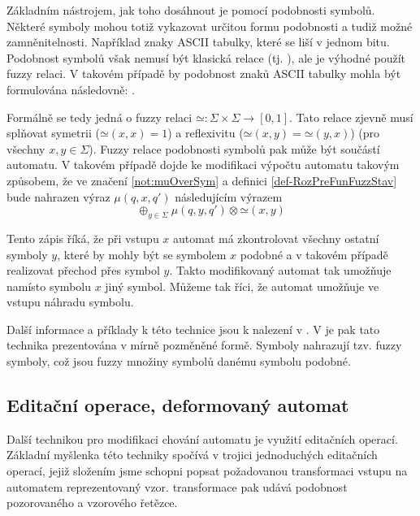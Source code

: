 \documentclass[a4paper,10pt]{article}
\begin{document}
Základním nástrojem, jak toho dosáhnout je pomocí podobnosti symbolů. Některé symboly mohou totiž vykazovat určitou formu podobnosti a tudiž možné zamněnitelnosti. Například znaky ASCII tabulky, které se liší v jednom bitu. Podobnost symbolů však nemusí být klasická  relace (tj. ), ale je výhodné použít fuzzy relaci. V takovém případě by podobnost znaků ASCII tabulky mohla být formulována následovně: .

Formálně se tedy jedná o fuzzy relaci $\mathbin{\simeq}: \Sigma \times \Sigma \rightarrow [0, 1]$. Tato relace zjevně musí splňovat symetrii ($\mathbin{\simeq}(x, x) = 1$) a reflexivitu ($\mathbin{\simeq}(x, y) = \mathbin{\simeq}(y, x)$) (pro všechny $x, y \in \Sigma$).
Fuzzy relace podobnosti symbolů pak může být součástí automatu. V takovém případě dojde ke modifikaci výpočtu automatu takovým způsobem, že ve značení \ref{not:muOverSym} a definici \ref{def-RozPreFunFuzzStav} bude nahrazen výraz $\mu(q, x, q')$ následujícím výrazem
$$
  \oplus_{y \in \Sigma} \mu(q, y, q') \otimes \mathbin{\simeq}(x, y)
$$

Tento zápis říká, že při vstupu $x$ automat má zkontrolovat všechny ostatní symboly $y$, které by mohly být se symbolem $x$ podobné a v takovém případě realizovat přechod přes symbol $y$. Takto modifikovaný automat tak umožňuje namísto symbolu $x$  jiný symbol. Můžeme tak říci, že automat umožňuje ve vstupu náhradu symbolu.

Další informace a příklady k této technice jsou k nalezení v \cite{RamGir-ConvFinAutFuzzAutStrComp}. V \cite{Ech-DefSyssConPre} je pak tato technika prezentována v mírně pozměněné formě. Symboly nahrazují tzv. fuzzy symboly, což jsou fuzzy množiny symbolů danému symbolu podobné.

\subsection{Editační operace, deformovaný automat} \label{sec:DefAut}
Další technikou pro modifikaci chování automatu je využití editačních operací. Základní myšlenka této techniky spočívá v trojici jednoduchých editačních operací, jejiž složením jsme schopni popsat požadovanou transformaci vstupu na automatem reprezentovaný vzor.  transformace pak udává podobnost pozorovaného a vzorového řetězce.
\end{document}
